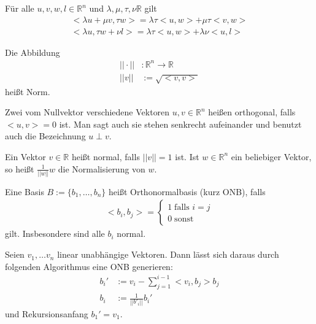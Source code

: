 \begin{Satz}
Für alle $u,v,w,l \in \mathbb{R}^n$ und $\lambda, \mu, \tau, \nu \mathbb{R}$ gilt
\begin{align*}
<\lambda u + \mu v, \tau w> = \lambda \tau<u,w> + \mu \tau <v,w> \\
<\lambda u , \tau w + \nu l> = \lambda \tau<u,w> + \lambda \nu <u,l>
\end{align*}
\end{Satz}
\begin{Definition}
Die Abbildung 
\begin{align*}
|| \cdot || &: \mathbb{R}^n  \to \mathbb{R} \\
||v||  &:= \sqrt{<v,v>} 
\end{align*}  
heißt Norm.
\end{Definition}

\begin{Definition}
Zwei vom Nullvektor verschiedene Vektoren $u,v \in \mathbb{R}^n$ heißen orthogonal, falls $<u,v> = 0$ ist. 
Man sagt auch sie stehen senkrecht aufeinander und benutzt auch die Bezeichnung $u \perp v$. 
\end{Definition}




\begin{Definition}
Ein Vektor $v \in \mathbb{R}$ heißt normal, falls $||v|| = 1$ ist.
Ist $w \in \mathbb{R}^n$ ein beliebiger Vektor, so heißt $\frac{1}{||w||} w$ die Normalisierung von $w$.
\end{Definition}

\begin{Definition}
Eine Basis  $B:= \{ b_1, \hdots , b_n \}$ heißt Orthonormalbasis (kurz ONB), falls 
\begin{align*}
<b_i, b_j> = \begin{cases}  1 \; \text{falls }  i = j  \\ 0 \; \text{sonst}\end{cases}
\end{align*}
gilt. Insbesondere sind alle $b_i$ normal.
\end{Definition}

\begin{Algorithmus}
Seien  $v_1, \hdots v_n$ linear unabhängige Vektoren.  Dann lässt sich daraus durch folgenden Algorithmus 
eine ONB generieren: 
\begin {align*}
b_i ' & := v_i - \sum_{j=1}^{i-1} <v_i, b_j> b_j \\
b_i  & :=  \frac{1}{||b'_i||} b_i'
\end{align*}
und Rekursionsanfang $b_1' = v_1$.
\end{Algorithmus}


